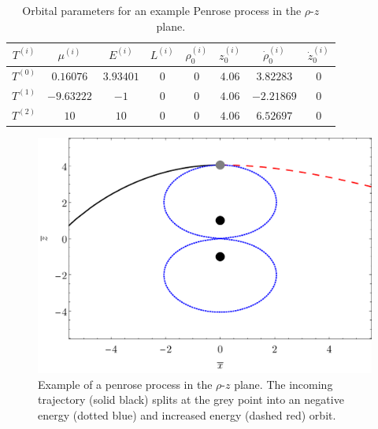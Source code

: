 \begin{table}[!htbp]
  \centering
  \caption{Orbital parameters for an example Penrose process in the $\rho$-$z$ plane.}
  \begin{tabular}{c|c|c|c|c|c|c|c|}
    \cline{1-8}
    \multicolumn{1}{|c|}{$T^{(i)}$} & $\mu^{(i)}$ & $E^{(i)}$ & $L^{(i)}$ & $\rho_0^{(i)}$ & $z_0^{(i)}$ & $\dot{\rho}_0^{(i)}$ & $\dot{z}_0^{(i)}$ \\ \hline
    \multicolumn{1}{|c|}{$T^{(0)}$} & $0.16076$   & $3.93401$ & $0$       & $0$            & $4.06$      & $3.82283$            & $0$               \\ \hline
    \multicolumn{1}{|c|}{$T^{(1)}$} & $-9.63222$  & $-1$      & $0$       & $0$            & $4.06$      & $-2.21869$           & $0$               \\ \hline
    \multicolumn{1}{|c|}{$T^{(2)}$} & $10$        & $10$      & $0$       & $0$            & $4.06$      & $6.52697$            & $0$               \\ \hline
  \end{tabular}
  \label{ch:penrose_binaries/tab:exemple_orbital_parameters_1}
\end{table}

\begin{figure}[!htbp]
  \centering
  \includegraphics[scale = 0.4]{img/penrose_binaries/mp/penrose_xz.pdf}
  \caption{Example of a penrose process in the $\rho$-$z$ plane. The incoming trajectory (solid black) splits at the grey point into an negative energy (dotted blue) and increased energy (dashed red) orbit.}
  \label{ch:penrose_binaries/fig:penrose_example_1}
\end{figure}


